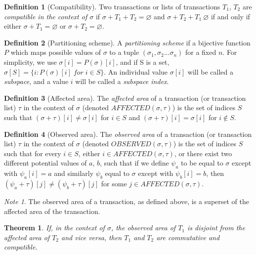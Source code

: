 \documentclass[11pt,a4paper]{report}
\theoremstyle{plain}
\newtheorem{thm}{Theorem}[section]
\theoremstyle{definition}
\newtheorem{defn}{Definition}[chapter]
\theoremstyle{remark}
\newtheorem*{note}{Note}
\begin{document}
\begin{defn}[Compatibility]
Two transactions or lists of transactions $T_1$, $T_2$ are \emph{compatible in the context of $\sigma$} if $\sigma + T_1 + T_2 = \varnothing$ and $\sigma + T_2 + T_1 \ \varnothing$ if and only if either $\sigma + T_1 = \varnothing$ or $\sigma + T_2 = \varnothing$.
\end{defn}

\begin{defn}[Partitioning scheme]
A \emph{partitioning scheme} if a bijective function $P$ which maps possible values of $\sigma$ to a tuple $(\sigma_1, \sigma_2 ... \sigma_n)$ for a fixed $n$. For simplicity, we use $\sigma[i] = P(\sigma)[i]$, and if S is a set, $\sigma[S] = \{i: P(\sigma)[i] \; for \; i \in S\}$. An individual value $\sigma[i]$ will be called a \emph{subspace}, and a value $i$ will be called a \emph{subspace index}.
\end{defn}

\begin{defn}[Affected area]
The \emph{affected area} of a transaction (or transaction list) $\tau$ in the context of $\sigma$ (denoted $AFFECTED(\sigma, \tau)$) is the set of indices $S$ such that $(\sigma + \tau)[i] \ne \sigma[i]$ for $i \in S$ and $(\sigma + \tau)[i] = \sigma[i]$ for $i \notin S$.
\end{defn}

\begin{defn}[Observed area]
The \emph{observed area} of a transaction (or transaction list) $\tau$ in the context of $\sigma$ (denoted $OBSERVED(\sigma, \tau)$) is the set of indices $S$ such that for every $i \in S$, either $i \in AFFECTED(\sigma, \tau)$, or there exist two different potential values of $a$, $b$, such that if we define $\psi_a$ to be equal to $\sigma$ except with $\psi_a[i] = a$ and similarly $\psi_b$ equal to $\sigma$ except with $\psi_b[i] = b$, then $(\psi_a + \tau)[j] \ne (\psi_b + \tau)[j]$ for some $j \in AFFECTED(\sigma, \tau)$.
\end{defn}

\begin{note}
The observed area of a transaction, as defined above, is a superset of the affected area of the transaction.
\end{note}

\begin{thm}
If, in the context of $\sigma$, the observed area of $T_1$ is disjoint from the affected area of $T_2$ and vice versa, then $T_1$ and $T_2$ are commutative and compatible.
\end{thm}
\end{document}
